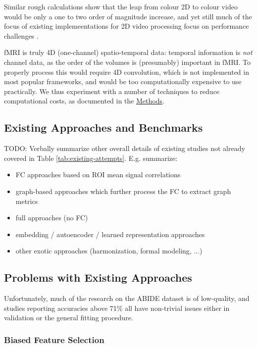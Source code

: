 \documentclass[10pt]{article}
\begin{document}
Similar rough calculations show that the leap from colour 2D to colour video would be only a one to
two order of magnitude increase, and yet still much of the focus of existing implemeentations for 2D
video processing focus on performance challenges
\citep[e.g.][]{tranCloserLookSpatiotemporal2018,tranVideoClassificationChannelSeparated2019,wangVideoModelingCorrelation2020}.

fMRI is truly 4D (one-channel) spatio-temporal data: temporal information is \emph{not} channel
data, as the order of the volumes is (presumably) important in fMRI. To properly process this would
require 4D convolution, which is not implemented in most popular frameworks, and would be too
computationally expensive to use practically. We thus experiment with a number of techniques to reduce
computational costs, as documented in the \hyperref[sec:methods]{Methods}.


\subsection{Existing Approaches and Benchmarks} \label{existing-attempts}

TODO: Verbally summarize other overall details of existing studies not already covered in Table
\ref{tab:existing-attempts}. E.g. summarize:

\begin{itemize}
  \item FC approaches based on ROI mean signal correlations
  \item graph-based approaches which further process the FC to extract graph metrics
  \item full approaches (no FC)
  \item embedding / autoencoder / learned representation approaches
  \item other exotic approaches (harmonization, formal modeling, ...)
\end{itemize}

\subsection{Problems with Existing Approaches}

Unfortunately, much of the research on the ABIDE dataset is of low-quality, and studies reporting
accuracies above 71\% all have non-trivial issues either in validation or the general
fitting procedure.

\subsubsection{Biased Feature Selection} \label{bias}
\end{document}
